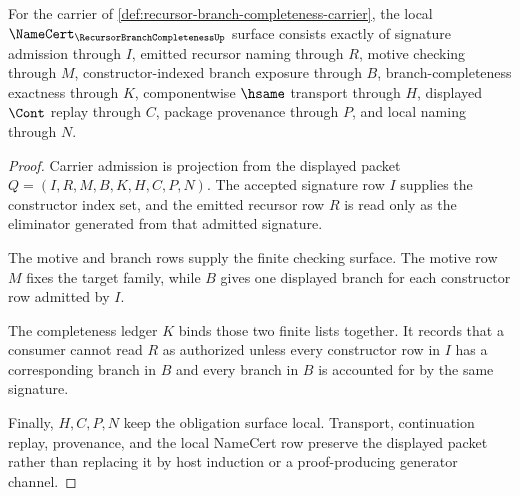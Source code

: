 \begin{theorem}
\label{thm:recursor-branch-completeness-namecert-obligations}
For the carrier of \autoref{def:recursor-branch-completeness-carrier}, the local $\NameCert_{\RecursorBranchCompletenessUp}$ surface consists exactly of signature admission through $I$, emitted recursor naming through $R$, motive checking through $M$, constructor-indexed branch exposure through $B$, branch-completeness exactness through $K$, componentwise $\hsame$ transport through $H$, displayed $\Cont$ replay through $C$, package provenance through $P$, and local naming through $N$.
\end{theorem}
\begin{proof}
Carrier admission is projection from the displayed packet $Q=(I,R,M,B,K,H,C,P,N)$. The accepted signature row $I$ supplies the constructor index set, and the emitted recursor row $R$ is read only as the eliminator generated from that admitted signature.

The motive and branch rows supply the finite checking surface. The motive row $M$ fixes the target family, while $B$ gives one displayed branch for each constructor row admitted by $I$.

The completeness ledger $K$ binds those two finite lists together. It records that a consumer cannot read $R$ as authorized unless every constructor row in $I$ has a corresponding branch in $B$ and every branch in $B$ is accounted for by the same signature.

Finally, $H,C,P,N$ keep the obligation surface local. Transport, continuation replay, provenance, and the local NameCert row preserve the displayed packet rather than replacing it by host induction or a proof-producing generator channel.
\end{proof}

